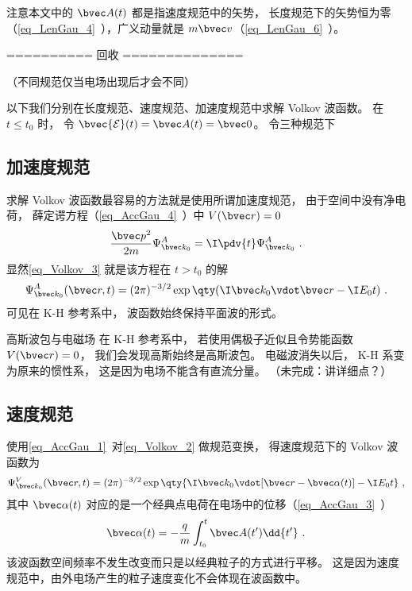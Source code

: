 注意本文中的 $\bvec A(t)$ 都是指速度规范中的矢势， 长度规范下的矢势恒为零（\autoref{eq_LenGau_4}~），广义动量就是 $m\bvec v$（\autoref{eq_LenGau_6}~）。

========== 回收 ==============


（不同规范仅当电场出现后才会不同）

以下我们分别在长度规范、速度规范、加速度规范中求解 Volkov 波函数。 在 $t \le t_0$ 时， 令 $\bvec {\mathcal E}(t) = \bvec A(t) = \bvec 0$。 令三种规范下 




\subsection{加速度规范}
求解 Volkov 波函数最容易的方法就是使用所谓加速度规范， 由于空间中没有净电荷， 薛定谔方程（\autoref{eq_AccGau_4}~）中 $V(\bvec r) = 0$
\begin{equation}
\frac{\bvec p^2}{2m}\Psi_{\bvec k_0}^A = \I \pdv{t} \Psi_{\bvec k_0}^A~.
\end{equation}
显然\autoref{eq_Volkov_3} 就是该方程在 $t > t_0$ 的解
\begin{equation}\label{eq_Volkov_2}
\Psi_{\bvec k_0}^A(\bvec r, t) = (2\pi)^{-3/2} \exp\qty(\I\bvec k_0 \vdot \bvec r - \I E_0 t)~.
\end{equation}
可见在 K-H 参考系中， 波函数始终保持平面波的形式。

\begin{example}{高斯波包与电磁场}
在 K-H 参考系中， 若使用偶极子近似且令势能函数 $V(\bvec r) = 0$， 我们会发现高斯始终是高斯波包。 电磁波消失以后， K-H 系变为原来的惯性系， 这是因为电场不能含有直流分量。 （未完成：讲详细点？）
\end{example}

\subsection{速度规范}
使用\autoref{eq_AccGau_1}~对\autoref{eq_Volkov_2} 做规范变换， 得速度规范下的 Volkov 波函数为
\begin{equation}\label{eq_Volkov_1}
\Psi_{\bvec k_0}^V(\bvec r, t) = (2\pi)^{-3/2} \exp\qty{\I \bvec k_0 \vdot [\bvec r - \bvec \alpha(t)] - \I E_0 t}~,
\end{equation}
其中 $\bvec \alpha(t)$ 对应的是一个经典点电荷在电场中的位移（\autoref{eq_AccGau_3}~）
\begin{equation}
\bvec \alpha(t) = -\frac{q}{m} \int_{t_0}^t \bvec A(t') \dd{t'}~.
\end{equation}
该波函数空间频率不发生改变而只是以经典粒子的方式进行平移。 这是因为速度规范中，由外电场产生的粒子速度变化不会体现在波函数中。

